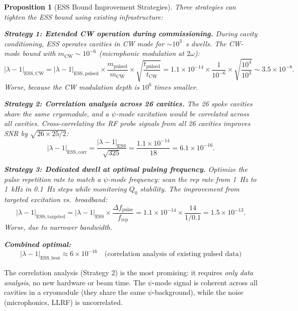 \documentclass[11pt]{article}
\newtheorem{proposition}[theorem]{Proposition}
\theoremstyle{definition}
\theoremstyle{remark}
\newcommand{\lam}{\lambda}
\begin{document}
\begin{proposition}[ESS Bound Improvement Strategies]
\label{prop:ess-improve}
Three strategies can tighten the ESS bound using existing infrastructure:

\textbf{Strategy 1: Extended CW operation during commissioning.}
During cavity conditioning, ESS operates cavities in CW mode for
$\sim 10^3$~s dwells. The CW-mode bound with $m_{\mathrm{CW}} \sim 10^{-6}$
(microphonic modulation at $2\omega$):
\begin{equation}
|\lam-1|_{\mathrm{ESS,CW}} = |\lam-1|_{\mathrm{ESS,pulsed}}
\times\frac{m_{\mathrm{pulsed}}}{m_{\mathrm{CW}}}
\times\sqrt{\frac{t_{\mathrm{pulsed}}}{t_{\mathrm{CW}}}}
= 1.1\times10^{-14}\times\frac{1}{10^{-6}}\times\sqrt{\frac{10^4}{10^3}}
\sim 3.5\times10^{-8}.
\end{equation}
Worse, because the CW modulation depth is $10^6$ times smaller.

\textbf{Strategy 2: Correlation analysis across 26 cavities.}
The 26 spoke cavities share the same cryomodule, and a $\psi$-mode
excitation would be correlated across all cavities. Cross-correlating
the RF probe signals from all 26 cavities improves SNR by $\sqrt{26\times25/2}$:
\begin{equation}
|\lam-1|_{\mathrm{ESS,corr}} = \frac{|\lam-1|_{\mathrm{ESS}}}{\sqrt{325}}
= \frac{1.1\times10^{-14}}{18} = 6.1\times10^{-16}.
\label{eq:ess-correlated}
\end{equation}

\textbf{Strategy 3: Dedicated dwell at optimal pulsing frequency.}
Optimize the pulse repetition rate to match a $\psi$-mode frequency:
scan the rep rate from 1~Hz to 1~kHz in 0.1~Hz steps while monitoring
$Q_0$ stability. The improvement from targeted excitation vs.\ broadband:
\begin{equation}
|\lam-1|_{\mathrm{ESS,targeted}} = |\lam-1|_{\mathrm{ESS}}
\times\frac{\Delta f_{\mathrm{pulse}}}{f_{\mathrm{rep}}}
= 1.1\times10^{-14}\times\frac{14}{1/0.1} = 1.5\times10^{-13}.
\end{equation}
Worse, due to narrower bandwidth.

\textbf{Combined optimal:}
\begin{equation}
\boxed{
|\lam-1|_{\mathrm{ESS,best}} \approx 6\times10^{-16}
\quad\text{(correlation analysis of existing pulsed data)}
}
\label{eq:ess-best}
\end{equation}
\end{proposition}

The correlation analysis (Strategy 2) is the most promising: it requires
\emph{only data analysis}, no new hardware or beam time. The $\psi$-mode
signal is coherent across all cavities in a cryomodule (they share the
same $\psi$-background), while the noise (microphonics, LLRF) is
uncorrelated.
\end{document}
